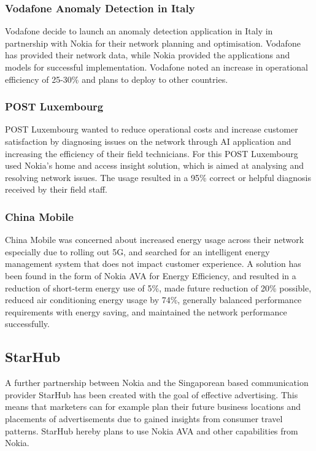 \documentclass[a4paper,12pt]{report}
\begin{document}
			\subsubsection{Vodafone Anomaly Detection in Italy}
			Vodafone decide to launch an anomaly detection application in Italy in partnership with Nokia for their network planning and optimisation. 
			Vodafone has provided their network data, while Nokia provided the applications and models for successful implementation. 
			Vodafone noted an increase in operational efficiency of 25-30\% and plans to deploy to other countries.	
			
			\subsubsection{POST Luxembourg}
			POST Luxembourg wanted to reduce operational costs and increase customer satisfaction by diagnosing issues on the network through AI application and increasing the efficiency of their field technicians.
			For this POST Luxembourg used Nokia's home and access insight solution, which is aimed at analysing and resolving network issues. 
			The usage resulted in a 95\% correct or helpful diagnosis received by their field staff.
			
			\subsubsection{China Mobile}
			China Mobile was concerned about increased energy usage across their network especially due to rolling out 5G, and searched for an intelligent energy management system that does not impact customer experience.
			A solution has been found in the form of Nokia AVA for Energy Efficiency, and resulted in a reduction of short-term energy use of 5\%, made future reduction of 20\% possible, reduced air conditioning energy usage by 74\%, generally balanced performance requirements with energy saving, and maintained the network performance successfully.
		\closesection

		\subsection[StarHub]{StarHub \cite{StarhubNokia}}
		\startsubsection
			A further partnership between Nokia and the Singaporean based communication provider StarHub has been created with the goal of effective advertising. 
			This means that marketers can for example plan their future business locations and placements of advertisements due to gained insights from consumer travel patterns. 
			StarHub hereby plans to use Nokia AVA and other capabilities from Nokia. 
		\closesection
		
\end{document}
